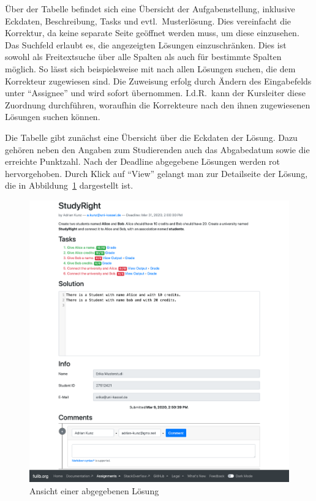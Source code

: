 Über der Tabelle befindet sich eine Übersicht der Aufgabenstellung, inklusive Eckdaten, Beschreibung, Tasks und evtl.\ Musterlösung.
Dies vereinfacht die Korrektur, da keine separate Seite geöffnet werden muss, um diese einzusehen.
Das Suchfeld erlaubt es, die angezeigten Lösungen einzuschränken.
Dies ist sowohl als Freitextsuche über alle Spalten als auch für bestimmte Spalten möglich.
So lässt sich beispielsweise mit  nach allen Lösungen suchen, die dem Korrekteur  zugewiesen sind.
Die Zuweisung erfolg durch Ändern des Eingabefelds unter ``Assignee'' und wird sofort übernommen.
I.d.R.\ kann der Kursleiter diese Zuordnung durchführen, woraufhin die Korrekteure nach den ihnen zugewiesenen Lösungen suchen können.

Die Tabelle gibt zunächst eine Übersicht über die Eckdaten der Lösung.
Dazu gehören neben den Angaben zum Studierenden auch das Abgabedatum sowie die erreichte Punktzahl.
Nach der Deadline abgegebene Lösungen werden rot hervorgehoben.
Durch Klick auf ``View'' gelangt man zur Detailseite der Lösung, die in Abbildung~\ref{fig:solution} dargestellt ist.

\begin{figure}
    \centering
    \includegraphics[width=\textwidth]{chapter/fulib.org/img/solution.png}
    \caption{Ansicht einer abgegebenen Lösung}
    \label{fig:solution}
\end{figure}

